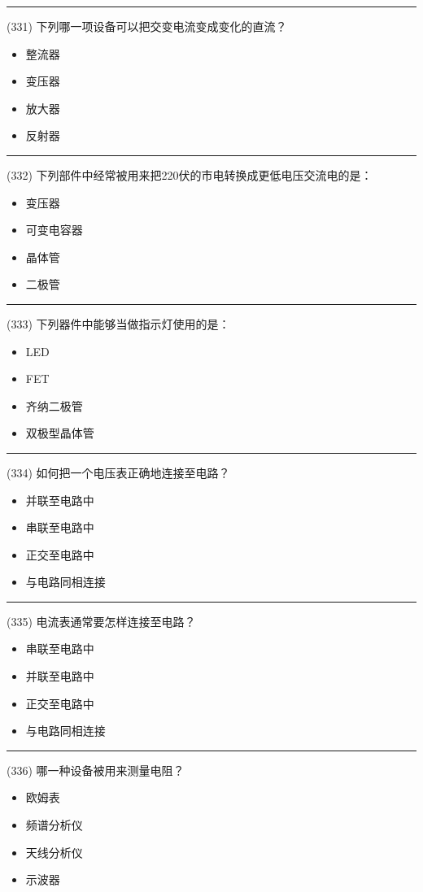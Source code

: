 \documentclass[twocolumn]{ctexart}  %
\begin{document}
\noindent\rule{0.5\textwidth}{1pt}
\heiti (331) 下列哪一项设备可以把交变电流变成变化的直流？ \songti {\color{gray} [LK1167] }
\begin{itemize}
	\item  整流器
	\item  变压器
	\item  放大器
	\item  反射器
\end{itemize}


\noindent\rule{0.5\textwidth}{1pt}
\heiti (332) 下列部件中经常被用来把220伏的市电转换成更低电压交流电的是： \songti {\color{gray} [LK1169] }
\begin{itemize}
	\item  变压器
	\item  可变电容器
	\item  晶体管
	\item  二极管
\end{itemize}


\noindent\rule{0.5\textwidth}{1pt}
\heiti (333) 下列器件中能够当做指示灯使用的是： \songti {\color{gray} [LK1170] }
\begin{itemize}
	\item  LED
	\item  FET
	\item  齐纳二极管
	\item  双极型晶体管
\end{itemize}


\noindent\rule{0.5\textwidth}{1pt}
\heiti (334) 如何把一个电压表正确地连接至电路？ \songti {\color{gray} [LK1192] }
\begin{itemize}
	\item  并联至电路中
	\item  串联至电路中
	\item  正交至电路中
	\item  与电路同相连接
\end{itemize}


\noindent\rule{0.5\textwidth}{1pt}
\heiti (335) 电流表通常要怎样连接至电路？ \songti {\color{gray} [LK1193] }
\begin{itemize}
	\item  串联至电路中
	\item  并联至电路中
	\item  正交至电路中
	\item  与电路同相连接
\end{itemize}


\noindent\rule{0.5\textwidth}{1pt}
\heiti (336) 哪一种设备被用来测量电阻？ \songti {\color{gray} [LK1194] }
\begin{itemize}
	\item  欧姆表
	\item  频谱分析仪
	\item  天线分析仪
	\item  示波器
\end{itemize}
\end{document}
